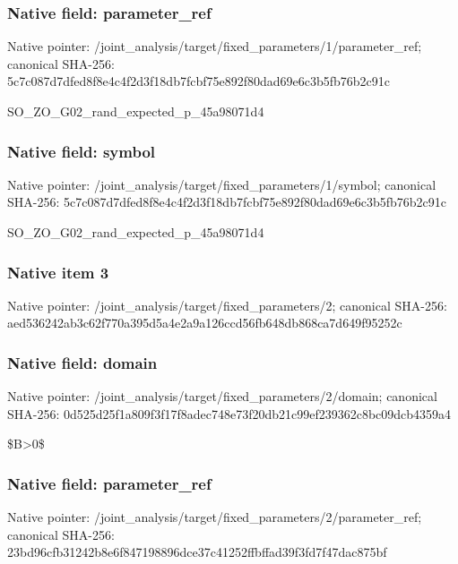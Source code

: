\documentclass[10pt,a4paper]{article}
\begin{document}
\subsubsection{Native field: parameter\_\allowbreak{}ref}
Native pointer: /joint\_\allowbreak{}analysis/target/fixed\_\allowbreak{}parameters/1/parameter\_\allowbreak{}ref; canonical SHA-256: 5c7c087d7dfed8f8e4c4f2d3f18db7fcbf75e892f80dad69e6c3b5fb76b2c91c

\begingroup\raggedright\sloppy SO\_\allowbreak{}ZO\_\allowbreak{}G02\_\allowbreak{}rand\_\allowbreak{}expected\_\allowbreak{}p\_\allowbreak{}45a98071d4\par\endgroup

\subsubsection{Native field: symbol}
Native pointer: /joint\_\allowbreak{}analysis/target/fixed\_\allowbreak{}parameters/1/symbol; canonical SHA-256: 5c7c087d7dfed8f8e4c4f2d3f18db7fcbf75e892f80dad69e6c3b5fb76b2c91c

\begingroup\raggedright\sloppy SO\_\allowbreak{}ZO\_\allowbreak{}G02\_\allowbreak{}rand\_\allowbreak{}expected\_\allowbreak{}p\_\allowbreak{}45a98071d4\par\endgroup

\subsubsection{Native item 3}
Native pointer: /joint\_\allowbreak{}analysis/target/fixed\_\allowbreak{}parameters/2; canonical SHA-256: aed536242ab3c62f770a395d5a4e2a9a126ccd56fb648db868ca7d649f95252c

\subsubsection{Native field: domain}
Native pointer: /joint\_\allowbreak{}analysis/target/fixed\_\allowbreak{}parameters/2/domain; canonical SHA-256: 0d525d25f1a809f3f17f8adec748e73f20db21c99ef239362c8bc09dcb4359a4

\begingroup\raggedright\sloppy \$B>0\$\par\endgroup

\subsubsection{Native field: parameter\_\allowbreak{}ref}
Native pointer: /joint\_\allowbreak{}analysis/target/fixed\_\allowbreak{}parameters/2/parameter\_\allowbreak{}ref; canonical SHA-256: 23bd96cfb31242b8e6f847198896dce37c41252ffbffad39f3fd7f47dac875bf
\end{document}
